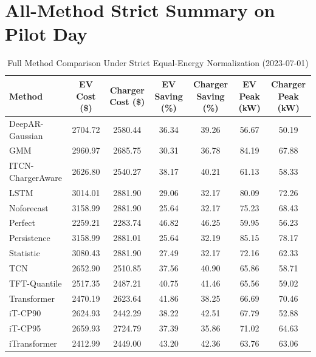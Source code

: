 \documentclass[journal]{IEEEtran}
\begin{document}
\section{All-Method Strict Summary on Pilot Day}
\begin{table}[t]
\caption{Full Method Comparison Under Strict Equal-Energy Normalization (2023-07-01)}
\centering
\scriptsize
\begin{tabular}{lcccccc}
\toprule
Method & EV Cost (\$) & Charger Cost (\$) & EV Saving (\%) & Charger Saving (\%) & EV Peak (kW) & Charger Peak (kW) \\
\midrule
DeepAR-Gaussian & 2704.72 & 2580.44 & 36.34 & 39.26 & 56.67 & 50.19 \\
GMM & 2960.97 & 2685.75 & 30.31 & 36.78 & 84.19 & 67.88 \\
ITCN-ChargerAware & 2626.80 & 2540.27 & 38.17 & 40.21 & 61.13 & 58.33 \\
LSTM & 3014.01 & 2881.90 & 29.06 & 32.17 & 80.09 & 72.26 \\
Noforecast & 3158.99 & 2881.90 & 25.64 & 32.17 & 75.23 & 68.43 \\
Perfect & 2259.21 & 2283.74 & 46.82 & 46.25 & 59.95 & 56.23 \\
Persistence & 3158.99 & 2881.01 & 25.64 & 32.19 & 85.15 & 78.17 \\
Statistic & 3080.43 & 2881.90 & 27.49 & 32.17 & 72.16 & 62.33 \\
TCN & 2652.90 & 2510.85 & 37.56 & 40.90 & 65.86 & 58.71 \\
TFT-Quantile & 2517.35 & 2487.21 & 40.75 & 41.46 & 65.56 & 59.02 \\
Transformer & 2470.19 & 2623.64 & 41.86 & 38.25 & 66.69 & 70.46 \\
iT-CP90 & 2624.93 & 2442.29 & 38.22 & 42.51 & 67.79 & 52.88 \\
iT-CP95 & 2659.93 & 2724.79 & 37.39 & 35.86 & 71.02 & 64.63 \\
iTransformer & 2412.99 & 2449.00 & 43.20 & 42.36 & 63.76 & 63.06 \\
\bottomrule
\end{tabular}
\label{tab:appendix_all_methods}
\end{table}
\end{document}
